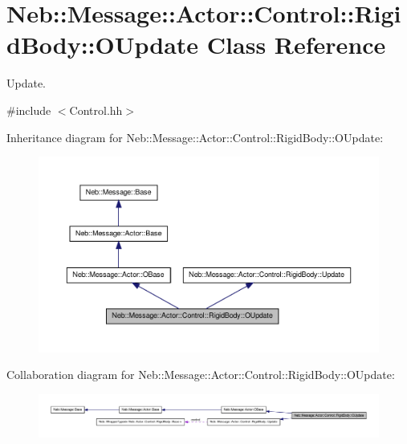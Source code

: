 \hypertarget{classNeb_1_1Message_1_1Actor_1_1Control_1_1RigidBody_1_1OUpdate}{\section{\-Neb\-:\-:\-Message\-:\-:\-Actor\-:\-:\-Control\-:\-:\-Rigid\-Body\-:\-:\-O\-Update \-Class \-Reference}
\label{classNeb_1_1Message_1_1Actor_1_1Control_1_1RigidBody_1_1OUpdate}
}


\-Update.  




{\ttfamily \#include $<$\-Control.\-hh$>$}



\-Inheritance diagram for \-Neb\-:\-:\-Message\-:\-:\-Actor\-:\-:\-Control\-:\-:\-Rigid\-Body\-:\-:\-O\-Update\-:\nopagebreak
\begin{figure}[H]
\begin{center}
\leavevmode
\includegraphics[width=350pt]{classNeb_1_1Message_1_1Actor_1_1Control_1_1RigidBody_1_1OUpdate__inherit__graph}
\end{center}
\end{figure}


\-Collaboration diagram for \-Neb\-:\-:\-Message\-:\-:\-Actor\-:\-:\-Control\-:\-:\-Rigid\-Body\-:\-:\-O\-Update\-:\nopagebreak
\begin{figure}[H]
\begin{center}
\leavevmode
\includegraphics[width=350pt]{classNeb_1_1Message_1_1Actor_1_1Control_1_1RigidBody_1_1OUpdate__coll__graph}
\end{center}
\end{figure}
